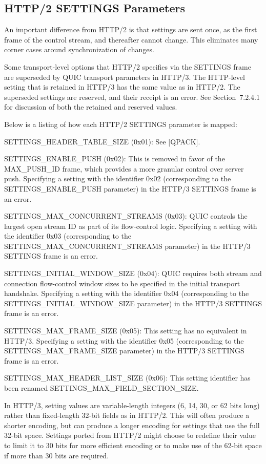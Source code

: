 \documentclass{article}
\begin{document}
\subsection{HTTP/2 SETTINGS Parameters}

An important difference from HTTP/2 is that settings are sent once, as the first frame of the control stream, and thereafter cannot change.  This eliminates many corner cases around synchronization of changes.

Some transport-level options that HTTP/2 specifies via the SETTINGS frame are superseded by QUIC transport parameters in HTTP/3.  The HTTP-level setting that is retained in HTTP/3 has the same value as in HTTP/2.  The superseded settings are reserved, and their receipt is an error.  See Section~7.2.4.1 for discussion of both the retained and reserved values.

Below is a listing of how each HTTP/2 SETTINGS parameter is mapped:

SETTINGS\_HEADER\_TABLE\_SIZE (0x01):  See [QPACK].

SETTINGS\_ENABLE\_PUSH (0x02):  This is removed in favor of the MAX\_PUSH\_ID frame, which provides a more granular control over server push.  Specifying a setting with the identifier 0x02 (corresponding to the SETTINGS\_ENABLE\_PUSH parameter) in the HTTP/3 SETTINGS frame is an error.

SETTINGS\_MAX\_CONCURRENT\_STREAMS (0x03):  QUIC controls the largest open stream ID as part of its flow-control logic.  Specifying a setting with the identifier 0x03 (corresponding to the SETTINGS\_MAX\_CONCURRENT\_STREAMS parameter) in the HTTP/3 SETTINGS frame is an error.

SETTINGS\_INITIAL\_WINDOW\_SIZE (0x04):  QUIC requires both stream and connection flow-control window sizes to be specified in the initial transport handshake.  Specifying a setting with the identifier 0x04 (corresponding to the SETTINGS\_INITIAL\_WINDOW\_SIZE parameter) in the HTTP/3 SETTINGS frame is an error.

SETTINGS\_MAX\_FRAME\_SIZE (0x05):  This setting has no equivalent in HTTP/3.  Specifying a setting with the identifier 0x05 (corresponding to the SETTINGS\_MAX\_FRAME\_SIZE parameter) in the HTTP/3 SETTINGS frame is an error.

SETTINGS\_MAX\_HEADER\_LIST\_SIZE (0x06):  This setting identifier has been renamed SETTINGS\_MAX\_FIELD\_SECTION\_SIZE.

In HTTP/3, setting values are variable-length integers (6, 14, 30, or 62 bits long) rather than fixed-length 32-bit fields as in HTTP/2. This will often produce a shorter encoding, but can produce a longer encoding for settings that use the full 32-bit space.  Settings ported from HTTP/2 might choose to redefine their value to limit it to 30 bits for more efficient encoding or to make use of the 62-bit space if more than 30 bits are required.
\end{document}
